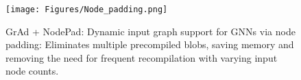 \begin{figure}[t!]
\begin{center}
\texttt{[image: Figures/Node\_padding.png]}%
\end{center}
\caption{GrAd + NodePad: Dynamic input graph support for GNNs via node padding: Eliminates multiple precompiled blobs, saving memory and removing the need for frequent recompilation with varying input node counts.}\label{fig:GrAd_NodePad}
\end{figure}



